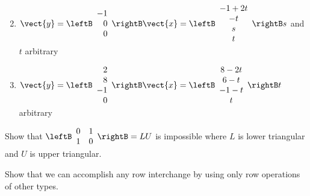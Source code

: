 \begin{multicols}{2}
\begin{ex}
\begin{enumerate}[leftmargin=1em,label={\alph*.}]
\end{enumerate}
\begin{sol}
\begin{enumerate}[label={\alph*.}]
\setcounter{enumi}{1}
\item $\vect{y} = \leftB \begin{array}{r}
-1 \\
0 \\
0
\end{array} \rightB \vect{x} = \leftB \begin{array}{c}
-1 + 2t \\
-t \\
s \\
t
\end{array} \rightB s$
 and $t$ arbitrary

\setcounter{enumi}{3}
\item $\vect{y} = \leftB \begin{array}{r}
2 \\
8 \\
-1 \\
0
\end{array} \rightB \vect{x} = \leftB \begin{array}{c}
8 - 2t \\
6 - t \\
-1 - t \\
t
\end{array} \rightB t$
 arbitrary

\end{enumerate}
\end{sol}
\end{ex}

\begin{ex}\label{ex:ex2_7_4}
Show that $\leftB \begin{array}{rr}
0 & 1 \\
1 & 0
\end{array} \rightB = LU$
 is impossible where $L$ is lower triangular and $U$ is upper triangular.
\end{ex}

\begin{ex}
Show that we can accomplish any row interchange by using only row operations of other types.


\end{ex}
\end{multicols}
